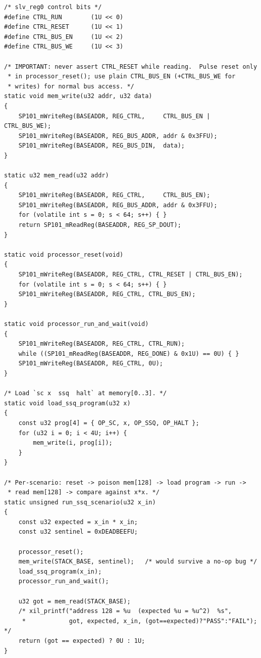 \documentclass[11pt,letterpaper]{article}
\begin{document}
\begin{lstlisting}[caption={Core of \texttt{main.c}: bus write, bus
read, processor reset, and the per-scenario flow that proves
\(\mathrm{addr}\,128 = x^{2}\).},label={lst:cmain}]
/* slv_reg0 control bits */
#define CTRL_RUN        (1U << 0)
#define CTRL_RESET      (1U << 1)
#define CTRL_BUS_EN     (1U << 2)
#define CTRL_BUS_WE     (1U << 3)

/* IMPORTANT: never assert CTRL_RESET while reading.  Pulse reset only
 * in processor_reset(); use plain CTRL_BUS_EN (+CTRL_BUS_WE for
 * writes) for normal bus access. */
static void mem_write(u32 addr, u32 data)
{
    SP101_mWriteReg(BASEADDR, REG_CTRL,     CTRL_BUS_EN | CTRL_BUS_WE);
    SP101_mWriteReg(BASEADDR, REG_BUS_ADDR, addr & 0x3FFU);
    SP101_mWriteReg(BASEADDR, REG_BUS_DIN,  data);
}

static u32 mem_read(u32 addr)
{
    SP101_mWriteReg(BASEADDR, REG_CTRL,     CTRL_BUS_EN);
    SP101_mWriteReg(BASEADDR, REG_BUS_ADDR, addr & 0x3FFU);
    for (volatile int s = 0; s < 64; s++) { }
    return SP101_mReadReg(BASEADDR, REG_SP_DOUT);
}

static void processor_reset(void)
{
    SP101_mWriteReg(BASEADDR, REG_CTRL, CTRL_RESET | CTRL_BUS_EN);
    for (volatile int s = 0; s < 64; s++) { }
    SP101_mWriteReg(BASEADDR, REG_CTRL, CTRL_BUS_EN);
}

static void processor_run_and_wait(void)
{
    SP101_mWriteReg(BASEADDR, REG_CTRL, CTRL_RUN);
    while ((SP101_mReadReg(BASEADDR, REG_DONE) & 0x1U) == 0U) { }
    SP101_mWriteReg(BASEADDR, REG_CTRL, 0U);
}

/* Load `sc x  ssq  halt` at memory[0..3]. */
static void load_ssq_program(u32 x)
{
    const u32 prog[4] = { OP_SC, x, OP_SSQ, OP_HALT };
    for (u32 i = 0; i < 4U; i++) {
        mem_write(i, prog[i]);
    }
}

/* Per-scenario: reset -> poison mem[128] -> load program -> run ->
 * read mem[128] -> compare against x*x. */
static unsigned run_ssq_scenario(u32 x_in)
{
    const u32 expected = x_in * x_in;
    const u32 sentinel = 0xDEADBEEFU;

    processor_reset();
    mem_write(STACK_BASE, sentinel);   /* would survive a no-op bug */
    load_ssq_program(x_in);
    processor_run_and_wait();

    u32 got = mem_read(STACK_BASE);
    /* xil_printf("address 128 = %u  (expected %u = %u^2)  %s",
     *            got, expected, x_in, (got==expected)?"PASS":"FAIL"); */
    return (got == expected) ? 0U : 1U;
}
\end{lstlisting}
\end{document}
